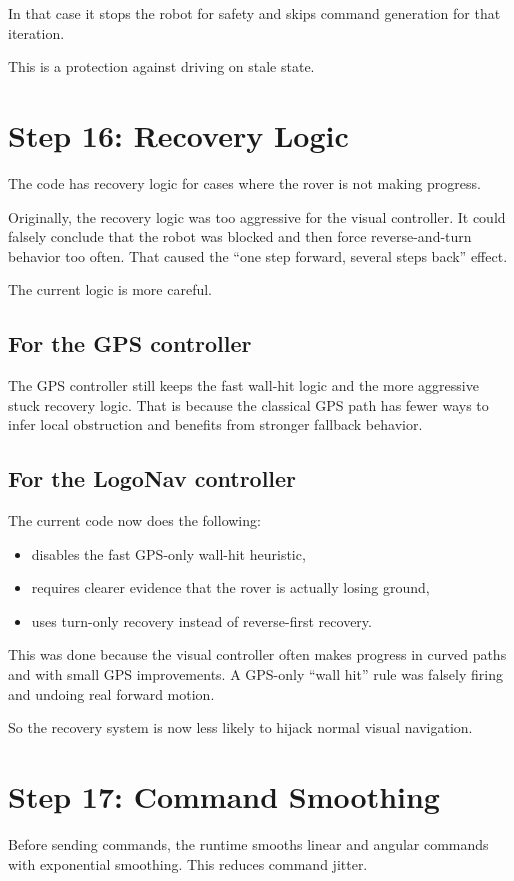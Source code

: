 \documentclass[11pt]{article}
\begin{document}
In that case it stops the robot for safety and skips command generation for that iteration.

This is a protection against driving on stale state.

\section*{Step 16: Recovery Logic}
The code has recovery logic for cases where the rover is not making progress.

Originally, the recovery logic was too aggressive for the visual controller.
It could falsely conclude that the robot was blocked and then force reverse-and-turn behavior too often.
That caused the ``one step forward, several steps back'' effect.

The current logic is more careful.

\subsection*{For the GPS controller}
The GPS controller still keeps the fast wall-hit logic and the more aggressive stuck recovery logic.
That is because the classical GPS path has fewer ways to infer local obstruction and benefits from stronger fallback behavior.

\subsection*{For the LogoNav controller}
The current code now does the following:
\begin{itemize}[leftmargin=*]
\item disables the fast GPS-only wall-hit heuristic,
\item requires clearer evidence that the rover is actually losing ground,
\item uses turn-only recovery instead of reverse-first recovery.
\end{itemize}

This was done because the visual controller often makes progress in curved paths and with small GPS improvements.
A GPS-only ``wall hit'' rule was falsely firing and undoing real forward motion.

So the recovery system is now less likely to hijack normal visual navigation.

\section*{Step 17: Command Smoothing}
Before sending commands, the runtime smooths linear and angular commands with exponential smoothing.
This reduces command jitter.
\end{document}
